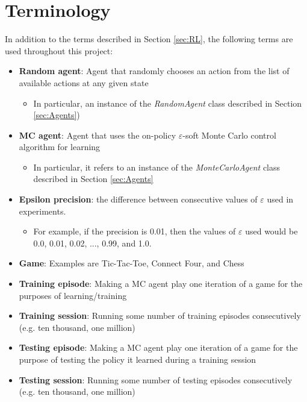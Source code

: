 \documentclass[11pt,a4paper]{report}
\begin{document}
\section{Terminology}
\label{sec:Terminology}

In addition to the terms described in Section \ref{sec:RL}, the following terms are used throughout this project:

\begin{itemize}

	\item \textbf{Random agent}: Agent that randomly chooses an action from the list of available actions at any given state
		\begin{itemize}
			\item In particular, an instance of the \emph{RandomAgent} class described in Section \ref{sec:Agents})
		\end{itemize}

	\item \textbf{MC agent}: Agent that uses the on-policy $\varepsilon$-soft Monte Carlo control algorithm for learning
		\begin{itemize}
			\item In particular, it refers to an instance of the \emph{MonteCarloAgent} class described in Section \ref{sec:Agents}
		\end{itemize}

	\item \textbf{Epsilon precision}: the difference between consecutive values of $\varepsilon$ used in experiments.
		\begin{itemize}
			\item For example, if the precision is 0.01, then the values of $\varepsilon$ used would be 0.0, 0.01, 0.02, ..., 0.99, and 1.0.
		\end{itemize}

	\item \textbf{Game}: Examples are Tic-Tac-Toe, Connect Four, and Chess

	\item \textbf{Training episode}: Making a MC agent play one iteration of a game for the purposes of learning/training

	\item \textbf{Training session}: Running some number of training episodes consecutively (e.g. ten thousand, one million)

	\item \textbf{Testing episode}: Making a MC agent play one iteration of a game for the purpose of testing the policy it learned during a training session

	\item \textbf{Testing session}: Running some number of testing episodes consecutively (e.g. ten thousand, one million)

\end{itemize}
\end{document}
